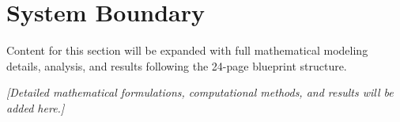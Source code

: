 \section{System Boundary}

Content for this section will be expanded with full mathematical modeling details, analysis, and results following the 24-page blueprint structure.

\vspace{0.5cm}

\noindent \textit{[Detailed mathematical formulations, computational methods, and results will be added here.]}
